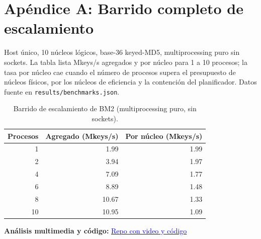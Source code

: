 \section*{Apéndice A: Barrido completo de escalamiento}
Host único, 10 núcleos lógicos, base-36 keyed-MD5, multiprocessing puro sin sockets. La tabla lista Mkeys/s agregados y por núcleo para 1 a 10 procesos; la tasa por núcleo cae cuando el número de procesos supera el presupuesto de núcleos físicos, por los núcleos de eficiencia y la contención del planificador. Datos fuente en \texttt{results/benchmarks.json}.

\begin{table}[H]
\centering\small
\begin{tabular}{r r r}
\hline
\textbf{Procesos} & \textbf{Agregado (Mkeys/s)} & \textbf{Por núcleo (Mkeys/s)}\\
\hline
1  & 1.99  & 1.99\\
2  & 3.94  & 1.97\\
4  & 7.09  & 1.77\\
6  & 8.89  & 1.48\\
8  & 10.67 & 1.33\\
10 & 10.95 & 1.09\\
\hline
\end{tabular}
\caption{Barrido de escalamiento de BM2 (multiprocessing puro, sin sockets).}
\end{table}

\noindent \textbf{Análisis multimedia y código:} \href{https://github.com/santihdzs/rip-hijacking}{\textcolor{blue}{Repo con video y código}}
